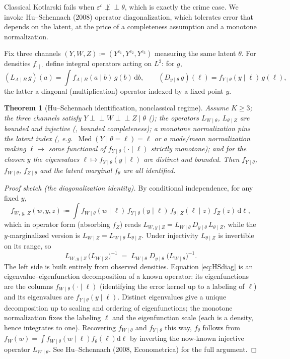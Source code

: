 \documentclass[11pt]{article}
\newtheorem{theorem}{Theorem}
\theoremstyle{definition}
\newcommand{\ind}{\perp\!\!\!\perp}
\newcommand{\Th}{\theta}
\newcommand{\lat}{\Th}
\begin{document}
Classical Kotlarski fails when $\varepsilon^c\not\ind\lat$, which is exactly the
crime case. We invoke Hu--Schennach (2008) operator diagonalization, which
tolerates error that depends on the latent, at the price of a completeness
assumption and a monotone normalization.

Fix three channels $(Y,W,Z)\coloneqq(Y^{c_1},Y^{c_2},Y^{c_3})$ measuring the
same latent $\lat$. For densities $f_{\cdot\mid\cdot}$ define integral operators
acting on $L^2$: for $g$,
\[
  (L_{A\mid B}\,g)(a)=\int f_{A\mid B}(a\mid b)\,g(b)\,\mathrm db,
  \qquad
  (D_{y\mid\lat}\,g)(\ell)=f_{Y\mid\lat}(y\mid \ell)\,g(\ell),
\]
the latter a diagonal (multiplication) operator indexed by a fixed point $y$.

\begin{theorem}[Hu--Schennach identification, nonclassical regime]
\label{thm:HS}
Assume $K\ge 3$; the three channels satisfy $Y\ind W\ind Z\mid\lat$
(); the operators $L_{W\mid\lat}$, $L_{\lat\mid Z}$ are bounded and
injective (, bounded completeness); a monotone normalization pins the
latent index (, e.g.\ $\operatorname{Med}(Y\mid\lat=\ell)=\ell$ or a
mode/mean normalization making $\ell\mapsto$ some functional of
$f_{Y\mid\lat}(\cdot\mid\ell)$ strictly monotone); and for the chosen $y$ the
eigenvalues $\ell\mapsto f_{Y\mid\lat}(y\mid\ell)$ are distinct and bounded.
Then $f_{Y\mid\lat}$, $f_{W\mid\lat}$, $f_{Z\mid\lat}$ and the latent marginal
$f_{\lat}$ are all identified.
\end{theorem}

\begin{proof}[Proof sketch (the diagonalization identity)]
By conditional independence, for any fixed $y$,
\[
  f_{W,\,y,\,Z}(w,y,z)\coloneqq\!\int\! f_{W\mid\lat}(w\mid\ell)\,
  f_{Y\mid\lat}(y\mid\ell)\,f_{\lat\mid Z}(\ell\mid z)\,f_Z(z)\,\mathrm d\ell,
\]
which in operator form (absorbing $f_Z$) reads
$L_{W,y\mid Z}=L_{W\mid\lat}\,D_{y\mid\lat}\,L_{\lat\mid Z}$, while the
$y$-marginalized version is $L_{W\mid Z}=L_{W\mid\lat}\,L_{\lat\mid Z}$. Under
injectivity $L_{\lat\mid Z}$ is invertible on its range, so
\begin{equation}\label{eq:HSdiag}
  L_{W,y\mid Z}\,\big(L_{W\mid Z}\big)^{-1}
  \;=\;
  L_{W\mid\lat}\;D_{y\mid\lat}\;\big(L_{W\mid\lat}\big)^{-1}.
\end{equation}
The left side is built entirely from observed densities. Equation
\eqref{eq:HSdiag} is an eigenvalue--eigenfunction decomposition of a known
operator: its eigenfunctions are the columns $f_{W\mid\lat}(\cdot\mid\ell)$
(identifying the error kernel up to a labeling of $\ell$) and its eigenvalues
are $f_{Y\mid\lat}(y\mid\ell)$. Distinct eigenvalues give a unique
decomposition up to scaling and ordering of eigenfunctions; the monotone
normalization  fixes the labeling $\ell$ and the eigenfunction scale
(each is a density, hence integrates to one). Recovering $f_{W\mid\lat}$ and
$f_{Y\mid\lat}$ this way, $f_\lat$ follows from
$f_{W}(w)=\int f_{W\mid\lat}(w\mid\ell)f_\lat(\ell)\mathrm d\ell$ by inverting
the now-known injective operator $L_{W\mid\lat}$. See Hu--Schennach (2008,
Econometrica) for the full argument.
\end{proof}
\end{document}
